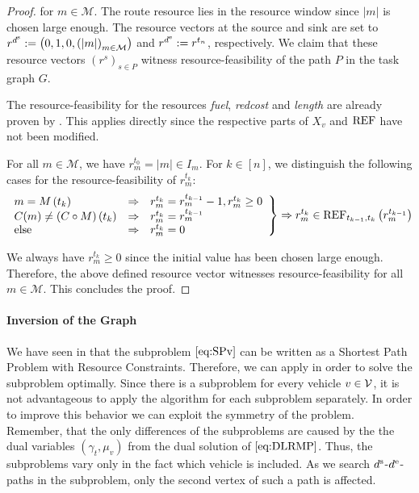 \begin{proof}
for $m\in\mathcal{M}$. The route resource lies in the resource window since $\vert m\vert$ is chosen large enough. The resource vectors at the source and sink are set to ${r^{d^{\operatorname{s}}} := \left(0,1,0,\left(\vert m\vert\right)_{m\in\mathcal{M}}\right)}$ and ${r^{d^{\operatorname{e}}} := r^{t_n}}$, respectively. We claim that these resource vectors $\left(r^s\right)_{s\in P}$ witness resource-feasibility of the path $P$ in the task graph $G$. 

The resource-feasibility for the resources \emph{fuel}, \emph{redcost} and \emph{length} are already proven by \cite{Kaiser}. This applies directly since the respective parts of $X_v$ and $\operatorname{REF}$ have not been modified.

For all $m\in\mathcal{M}$, we have ${r^{t_0}_m = \vert m\vert\in I_m}$. For ${k\in[n]}$, we distinguish the following cases for the resource-feasibility of $r^{t_k}_m$:
\begin{align*}
	\left. \begin{array}{lll}
		m = M\left(t_k\right) & \Rightarrow & r^{t_k}_m = r^{t_{k-1}}_m - 1, r^{t_k}_m\geq 0 \\
		C(m)\neq\left(C\circ M\right)\left(t_k\right) & \Rightarrow  & r^{t_k}_m = r^{t_{k-1}}_m \\
		\text{else} & \Rightarrow & r^{t_k}_m = 0
	\end{array} \right\} \Rightarrow r^{t_k}_m\in\operatorname{REF}_{t_{k-1},t_k}\left(r^{t_{k-1}}_m\right)
\end{align*}

We always have ${r^{t_k}_m\geq 0}$ since the initial value has been chosen large enough. Therefore, the above defined resource vector witnesses resource-feasibility for all $m\in\mathcal{M}$. This concludes the proof.
%
\end{proof}

\paragraph{Inversion of the Graph} \parfill

We have seen in  that the subproblem $\eqref{eq:SPv}$ can be written as a Shortest Path Problem with Resource Constraints. Therefore, we can apply  in order to solve the subproblem optimally. Since there is a subproblem for every vehicle $v\in\mathcal{V}$, it is not advantageous to apply the algorithm for each subproblem separately. In order to improve this behavior we can exploit the symmetry of the problem. Remember, that the only differences of the subproblems are caused by the the dual variables $\left(\gamma_t,\mu_v\right)$ from the dual solution of $\eqref{eq:DLRMP}$. Thus, the subproblems vary only in the fact which vehicle is included. As we search $d^{\operatorname{s}}$-$d^{\operatorname{e}}$-paths in the subproblem, only the second vertex of such a path is affected. 

